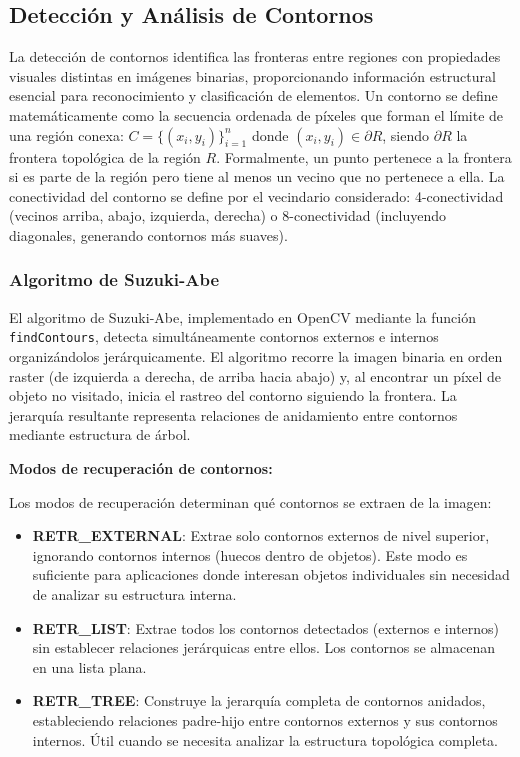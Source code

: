 \subsection{Detección y Análisis de Contornos}

La detección de contornos identifica las fronteras entre regiones con propiedades visuales distintas en imágenes binarias, proporcionando información estructural esencial para reconocimiento y clasificación de elementos. Un contorno se define matemáticamente como la secuencia ordenada de píxeles que forman el límite de una región conexa: $C = \{(x_i, y_i)\}_{i=1}^{n}$ donde $(x_i, y_i) \in \partial R$, siendo $\partial R$ la frontera topológica de la región $R$. Formalmente, un punto pertenece a la frontera si es parte de la región pero tiene al menos un vecino que no pertenece a ella. La conectividad del contorno se define por el vecindario considerado: 4-conectividad (vecinos arriba, abajo, izquierda, derecha) o 8-conectividad (incluyendo diagonales, generando contornos más suaves).

\subsubsection{Algoritmo de Suzuki-Abe}

El algoritmo de Suzuki-Abe, implementado en OpenCV mediante la función \texttt{findContours}, detecta simultáneamente contornos externos e internos organizándolos jerárquicamente. El algoritmo recorre la imagen binaria en orden raster (de izquierda a derecha, de arriba hacia abajo) y, al encontrar un píxel de objeto no visitado, inicia el rastreo del contorno siguiendo la frontera. La jerarquía resultante representa relaciones de anidamiento entre contornos mediante estructura de árbol.

\textbf{Modos de recuperación de contornos:}

Los modos de recuperación determinan qué contornos se extraen de la imagen:

\begin{itemize}
\item \textbf{RETR\_EXTERNAL}: Extrae solo contornos externos de nivel superior, ignorando contornos internos (huecos dentro de objetos). Este modo es suficiente para aplicaciones donde interesan objetos individuales sin necesidad de analizar su estructura interna.

\item \textbf{RETR\_LIST}: Extrae todos los contornos detectados (externos e internos) sin establecer relaciones jerárquicas entre ellos. Los contornos se almacenan en una lista plana.

\item \textbf{RETR\_TREE}: Construye la jerarquía completa de contornos anidados, estableciendo relaciones padre-hijo entre contornos externos y sus contornos internos. Útil cuando se necesita analizar la estructura topológica completa.
\end{itemize}

